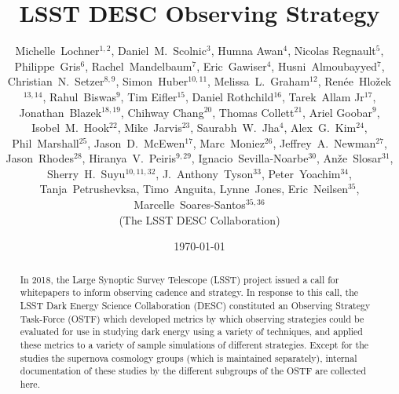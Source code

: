 \documentclass[modern,skiphelvet]{lsstdescnote}
\begin{document}
\title{LSST DESC Observing Strategy}
\author{
\parbox{0.9\textwidth}{
\normalsize
Michelle~Lochner$^{1,2}$,
Daniel~M.~Scolnic$^{3}$,
Humna Awan$^{4}$,
Nicolas Regnault$^{5}$,
Philippe~Gris$^{6}$,
Rachel~Mandelbaum$^{7}$,
Eric~Gawiser$^{4}$,
Husni~Almoubayyed$^{7}$,
Christian~N.~Setzer$^{8,9}$,
Simon~Huber$^{10,11}$,
Melissa~L.~Graham$^{12}$,
Ren\'ee~Hlo\v{z}ek$^{13,14}$,
Rahul~Biswas$^{9}$,
Tim Eifler$^{15}$,
Daniel Rothchild$^{16}$,
Tarek~Allam Jr$^{17}$,
Jonathan~Blazek$^{18,19}$,
Chihway Chang$^{20}$,
Thomas Collett$^{21}$,
Ariel Goobar$^{9}$,
Isobel~M.~Hook$^{22}$,
Mike~Jarvis$^{23}$,
Saurabh~W.~Jha$^{4}$,
Alex~G.~Kim$^{24}$,
Phil~Marshall$^{25}$,
Jason~D.~McEwen$^{17}$,
Marc~Moniez$^{26}$,
Jeffrey~A.~Newman$^{27}$,
Jason~Rhodes$^{28}$,
Hiranya~V.~Peiris$^{9,29}$,
Ignacio~Sevilla-Noarbe$^{30}$,
An\v{z}e~Slosar$^{31}$,
Sherry~H.~Suyu$^{10,11,32}$,
J.~Anthony~Tyson$^{33}$,
Peter~Yoachim$^{34}$,
Tanja~Petrushevksa,
Timo~Anguita,
Lynne~Jones,
Eric~Neilsen$^{35}$,
Marcelle~Soares-Santos$^{35,36}$
\begin{center}(The LSST DESC Collaboration)\end{center}
}}
\date{\today}

\maketitle

\begin{abstract}
In 2018, the Large Synoptic Survey Telescope (LSST) project issued a
call for whitepapers to inform observing cadence and strategy. In
response to this call, the LSST Dark Energy Science Collaboration
(DESC) constituted an Observing Strategy Task-Force (OSTF) which
developed metrics by which observing strategies could be evaluated for
use in studying dark energy using a variety of techniques, and applied
these metrics to a variety of sample simulations of different
strategies. Except for the studies the supernova cosmology groups
(which is maintained separately), internal documentation of these
studies by the different subgroups of the OSTF are collected here.
\end{abstract}

\pagebreak
\tableofcontents

\pagebreak


\pagebreak


\pagebreak

\pagebreak

\pagebreak

\pagebreak

\pagebreak


% 

\pagebreak

\pagebreak

\pagebreak

% 





\end{document}
